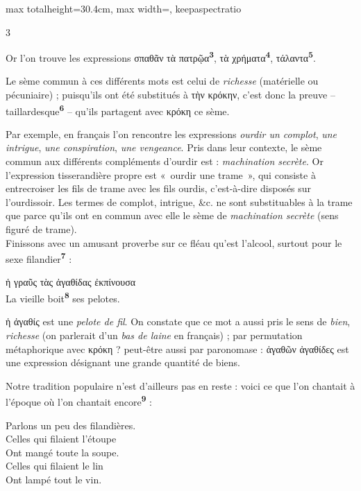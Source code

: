 \documentclass[11pt,twoside]{book}
\newcommand{\italique}[1]{\textit{#1}}
\newcommand{\citComm}[1]{\begin{quoting}[vskip=0.4pt,leftmargin=0.7em,rightmargin=0.2em]#1\end{quoting}}
\newcommand{\francais}[1]{{\policeFr #1}}
\newcommand{\marqueur}[1]{\textsuperscript{\color{rubricRed}\textbf{#1}}}
\begin{document}
\begin{adjustbox}{max totalheight=30.4cm, max width=\textwidth, keepaspectratio}
\begin{minipage}{\textwidth}
{\begin{multicols}{3}
\par\vspace{1.5pt}
\noindent Or l'on trouve les expressions σπαθᾶν τὰ πατρῷα\marqueur{3}, τὰ χρήματα\marqueur{4}, τάλαντα\marqueur{5}.
\par\vspace{1.5pt}
\noindent Le sème commun à ces différents mots est celui de \italique{richesse} (matérielle ou pécuniaire) ; puisqu'ils ont été substitués à τὴν κρόκην, c'est donc la preuve -- taillardesque\marqueur{6} -- qu'ils partagent avec κρόκη ce sème.
\par\vspace{1.5pt}
\noindent Par exemple, en français l'on rencontre les expressions \italique{ourdir un complot}, \italique{une intrigue}, \italique{une conspiration}, \italique{une vengeance}. Pris dans leur contexte, le sème commun aux différents compléments d'ourdir est : \italique{machination secrète}. Or l'expression tisserandière propre est «~ourdir une trame~», qui consiste à entrecroiser les fils de trame avec les fils ourdis, c'est-à-dire disposés sur l'ourdissoir. Les termes de complot, intrigue, \&c. ne sont substituables à la trame que parce qu'ils ont en commun avec elle le sème de \italique{machination secrète} (sens figuré de trame).\\ Finissons avec un amusant proverbe sur ce fléau qu'est l'alcool, surtout pour le sexe filandier\marqueur{7} :
\citComm{ἡ γραῦς τὰς ἀγαθίδας ἐκπίνουσα\\
La vieille boit\marqueur{8} ses pelotes.}
\par\vspace{1.5pt}
\noindent ἡ ἀγαθίς est une \italique{pelote de fil}. On constate que ce mot a aussi pris le sens de \italique{bien}, \italique{richesse} (on parlerait d'un \italique{bas de laine} en français) ; par permutation métaphorique avec κρόκη ? peut-être aussi par paronomase : ἀγαθῶν ἀγαθίδες est une expression désignant une grande quantité de biens.
\par\vspace{1.5pt}
\noindent Notre tradition populaire n'est d'ailleurs pas en reste : voici ce que l'on chantait à l'époque où l'on chantait encore\marqueur{9} :
\citComm{\francais{Parlons un peu des filandières.\\
Celles qui filaient l'étoupe\\
Ont mangé toute la soupe.\\
Celles qui filaient le lin\\
Ont lampé tout le vin.}}
\par\vspace{1.5pt}

\end{multicols}}
\end{minipage}
\end{adjustbox}
\end{document}
